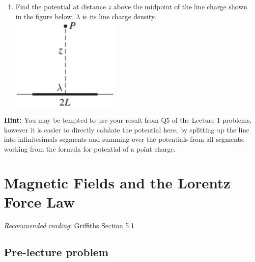 \documentclass[
  letterpaper,
  DIV=11,
  numbers=noendperiod]{scrreprt}
\providecommand{\tightlist}{%
  \setlength{\itemsep}{0pt}\setlength{\parskip}{0pt}}\usepackage{longtable,booktabs,array}
\begin{document}
\begin{enumerate}
\def\labelenumi{\arabic{enumi})}
\setcounter{enumi}{2}
\tightlist
\item
  Find the potential at distance \(z\) above the midpoint of the line
  charge shown in the figure below. \(\lambda\) is its line charge
  density.
  \includegraphics[width=2.08333in,height=\textheight]{Figures/L2_prob3.png}
\end{enumerate}

\textbf{Hint:} You may be tempted to use your result from Q5 of the
Lecture 1 problems, however it is easier to directly calulate the
potential here, by splitting up the line into infinitesimals segments
and summing over the potentials from all segments, working from the
formula for potential of a point charge.


\chapter{Magnetic Fields and the Lorentz Force
Law}\label{magnetic-fields-and-the-lorentz-force-law}

\newcommand{\l}{\mathrm{\mathbf{l}}}
\newcommand{\E}{\mathrm{\mathbf{E}}}
\newcommand{\F}{\mathrm{\mathbf{F}}}
\newcommand{\r}{\mathrm{\mathbf{r}}}
\newcommand{\B}{\mathrm{\mathbf{B}}}
\newcommand{\A}{\mathrm{\mathbf{A}}}
\newcommand{\x}{\mathrm{\mathbf{x}}}
\newcommand{\y}{\mathrm{\mathbf{y}}}
\newcommand{\z}{\mathrm{\mathbf{z}}}
\newcommand{\v}{\mathrm{\mathbf{v}}}
\newcommand{\p}{\mathrm{\mathbf{p}}}
\newcommand{\d}{\mathrm{\mathbf{d}}}

\newcommand{\a}{\mathrm{\mathbf{a}}}
\newcommand{\b}{\mathrm{\mathbf{b}}}
\newcommand{\I}{\mathrm{\mathbf{I}}}
\newcommand{\K}{\mathrm{\mathbf{K}}}
\newcommand{\J}{\mathrm{\mathbf{J}}}
\newcommand{\A}{\mathrm{\mathbf{A}}}
\newcommand{\dd}{\mathrm{d}}

\emph{Recommended reading}: Griffiths Section 5.1

\section{Pre-lecture problem}\label{pre-lecture-problem-2}
\end{document}
